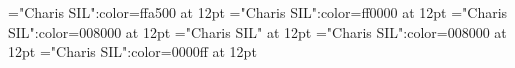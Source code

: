 \documentclass[a4paper]{article}
\begin{document}
\pagestyle{plain}
\sloppy
\setlength{\parfillskip}{0pt plus 1fil}
\font\xitemen="Charis SIL":color=ffa500 at 12pt
\font\xitemmain="Charis SIL":color=ff0000 at 12pt
\font\xitemenxitem="Charis SIL":color=008000 at 12pt
\font\main="Charis SIL" at 12pt
\font\xitemenmain="Charis SIL":color=008000 at 12pt
\font\xitemxitemmain="Charis SIL":color=0000ff at 12pt

\newpage 
\thispagestyle{empty} 
\mbox{} 
\newpage 
\newpage 
\setcounter{page}{1} 
\pagestyle{fancy} 








\end{document}
